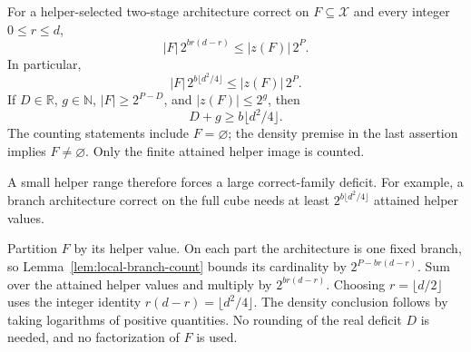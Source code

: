 \begin{theorem}\label{thm:local-helper-count}
For a helper-selected two-stage architecture correct on $F\subseteq\mathcal X$
and every integer $0\le r\le d$,
\begin{equation}\label{eq:local-helper-count}
  |F|\,2^{br(d-r)}\le |z(F)|\,2^P.
\end{equation}
In particular,
\[
  |F|\,2^{b\lfloor d^2/4\rfloor}\le |z(F)|\,2^P.
\]
If $D\in\mathbb R$, $g\in\mathbb N$, $|F|\ge2^{P-D}$, and
$|z(F)|\le2^g$, then
\begin{equation}\label{eq:local-helper-deficit}
  D+g\ge b\lfloor d^2/4\rfloor.
\end{equation}
The counting statements include $F=\varnothing$; the density premise in the
last assertion implies $F\ne\varnothing$.  Only the finite attained helper
image is counted.
\end{theorem}
A small helper range therefore forces a large correct-family deficit.
For example, a branch architecture correct on the full cube needs at least
$2^{b\lfloor d^2/4\rfloor}$ attained helper values.
\begin{proofoutline}
Partition $F$ by its helper value.  On each part the architecture is one fixed
branch, so Lemma~\ref{lem:local-branch-count} bounds its cardinality by
$2^{P-br(d-r)}$.  Sum over the attained helper values and multiply by
$2^{br(d-r)}$.  Choosing $r=\lfloor d/2\rfloor$ uses the integer identity
$r(d-r)=\lfloor d^2/4\rfloor$.  The density conclusion follows by taking
logarithms of positive quantities.  No rounding of the real deficit $D$ is
needed, and no factorization of $F$ is used.
\end{proofoutline}

